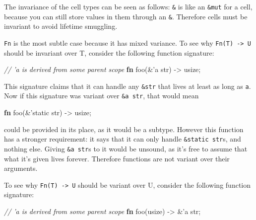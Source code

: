 \documentclass[a4paper,]{book}
\newenvironment{Shaded}{\begin{snugshade}}{\end{snugshade}}
\newcommand{\KeywordTok}[1]{\textcolor[rgb]{0.13,0.29,0.53}{\textbf{{#1}}}}
\newcommand{\DataTypeTok}[1]{\textcolor[rgb]{0.13,0.29,0.53}{{#1}}}
\newcommand{\CommentTok}[1]{\textcolor[rgb]{0.56,0.35,0.01}{\textit{{#1}}}}
\newcommand{\OtherTok}[1]{\textcolor[rgb]{0.56,0.35,0.01}{{#1}}}
\newcommand{\NormalTok}[1]{{#1}}
\begin{document}
The invariance of the cell types can be seen as follows: \texttt{\&} is
like an \texttt{\&mut} for a cell, because you can still store values in
them through an \texttt{\&}. Therefore cells must be invariant to avoid
lifetime smuggling.

\texttt{Fn} is the most subtle case because it has mixed variance. To
see why \texttt{Fn(T)\ -\textgreater{}\ U} should be invariant over T,
consider the following function signature:

\begin{Shaded}
\begin{Highlighting}[]
\CommentTok{// 'a is derived from some parent scope}
\KeywordTok{fn} \NormalTok{foo(&}\OtherTok{'a} \DataTypeTok{str}\NormalTok{) -> }\DataTypeTok{usize}\NormalTok{;}
\end{Highlighting}
\end{Shaded}

This signature claims that it can handle any \texttt{\&str} that lives
at least as long as \texttt{\textquotesingle{}a}. Now if this signature
was variant over \texttt{\&\textquotesingle{}a\ str}, that would mean

\begin{Shaded}
\begin{Highlighting}[]
\KeywordTok{fn} \NormalTok{foo(&}\OtherTok{'static} \DataTypeTok{str}\NormalTok{) -> }\DataTypeTok{usize}\NormalTok{;}
\end{Highlighting}
\end{Shaded}

could be provided in its place, as it would be a subtype. However this
function has a stronger requirement: it says that it can only handle
\texttt{\&\textquotesingle{}static\ str}s, and nothing else. Giving
\texttt{\&\textquotesingle{}a\ str}s to it would be unsound, as it's
free to assume that what it's given lives forever. Therefore functions
are not variant over their arguments.

To see why \texttt{Fn(T)\ -\textgreater{}\ U} should be variant over U,
consider the following function signature:

\begin{Shaded}
\begin{Highlighting}[]
\CommentTok{// 'a is derived from some parent scope}
\KeywordTok{fn} \NormalTok{foo(}\DataTypeTok{usize}\NormalTok{) -> &}\OtherTok{'a} \DataTypeTok{str}\NormalTok{;}
\end{Highlighting}
\end{Shaded}
\end{document}
